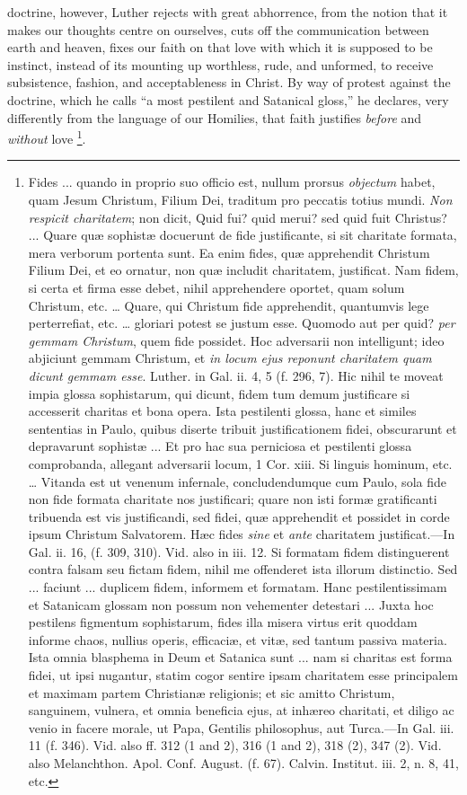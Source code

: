 doctrine, however, Luther rejects with great abhorrence, from the
notion that it makes our thoughts centre on ourselves, cuts off the
communication between earth and heaven, fixes our faith on that love
with which it is supposed to be instinct, instead of its mounting up
worthless, rude, and unformed, to receive subsistence, fashion, and
acceptableness in Christ. By way of protest against the doctrine,
which he calls ``a most pestilent and Satanical gloss,'' he
declares, very differently from the language of our Homilies, that
faith justifies \emph{before} and \emph{without} love \footnote{Fides ...
quando in proprio suo officio est, nullum prorsus \emph{objectum}
habet, quam Jesum Christum, Filium Dei, traditum pro peccatis totius
mundi. \emph{Non respicit charitatem}; non dicit, Quid fui? quid merui?
sed quid fuit Christus? ... Quare quæ sophistæ docuerunt de fide
justificante, si sit charitate formata, mera verborum portenta sunt.
Ea enim fides, quæ apprehendit Christum Filium Dei, et eo ornatur,
non quæ includit charitatem, justificat. Nam fidem, si certa et firma
esse debet, nihil apprehendere oportet, quam solum Christum, etc. …
Quare, qui Christum fide apprehendit, quantumvis lege perterrefiat,
etc. … gloriari potest se justum esse. Quomodo aut per quid? \emph{per
gemmam Christum}, quem fide possidet. Hoc adversarii non
intelligunt; ideo abjiciunt gemmam Christum, et \emph{in locum ejus
reponunt charitatem quam dicunt gemmam esse}. Luther. in Gal. ii.
4, 5 (f. 296, 7). Hic nihil te moveat impia glossa sophistarum, qui
dicunt, fidem tum demum justificare si accesserit charitas et bona
opera. Ista pestilenti glossa, hanc et similes sententias in Paulo,
quibus diserte tribuit justificationem fidei, obscurarunt et
depravarunt sophistæ ... Et pro hac sua perniciosa et pestilenti
glossa comprobanda, allegant adversarii locum, 1 Cor. xiii. Si
linguis hominum, etc. … Vitanda est ut venenum infernale,
concludendumque cum Paulo, sola fide non fide formata charitate nos
justificari; quare non isti formæ gratificanti tribuenda est vis
justificandi, sed fidei, quæ apprehendit et possidet in corde ipsum
Christum Salvatorem. Hæc fides \emph{sine} et \emph{ante} charitatem
justificat.—In Gal. ii. 16, (f. 309, 310). Vid. also in iii. 12. Si
formatam fidem distinguerent contra falsam seu fictam fidem, nihil me
offenderet ista illorum distinctio. Sed ... faciunt ... duplicem fidem,
informem et formatam. Hanc pestilentissimam et Satanicam glossam non
possum non vehementer detestari ... Juxta hoc pestilens figmentum
sophistarum, fides illa misera virtus erit quoddam informe chaos,
nullius operis, efficaciæ, et vitæ, sed tantum passiva materia. Ista
omnia blasphema in Deum et Satanica sunt ... nam si charitas est forma
fidei, ut ipsi nugantur, statim cogor sentire ipsam charitatem esse
principalem et maximam partem Christianæ religionis; et sic amitto
Christum, sanguinem, vulnera, et omnia beneficia ejus, at inhæreo
charitati, et diligo ac venio in facere morale, ut Papa, Gentilis
philosophus, aut Turca.—In Gal. iii. 11 (f. 346). Vid. also ff. 312
(1 and 2), 316 (1 and 2), 318 (2), 347 (2). Vid. also Melanchthon.
Apol. Conf. August. (f. 67). Calvin. Institut. iii. 2, n. 8, 41, etc.}.

